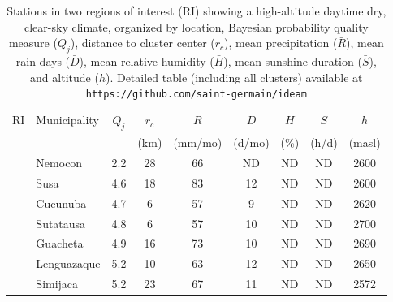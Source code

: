 \documentclass[12pt]{iopart}
\begin{document}
\begin{table}
\caption{\label{tabfin}Stations in two regions of interest (RI) showing a high-altitude daytime dry, clear-sky climate, organized by location, Bayesian probability quality measure ($Q_j$), distance to cluster center ($r_c$), mean precipitation  ($\bar{R}$), mean rain days ($\bar{D}$), mean relative humidity  ($\bar{H}$), mean sunshine duration  ($\bar{S}$), and altitude ($h$). Detailed table (including all clusters) available at \texttt{https://github.com/saint-germain/ideam} \\}

\begin{tabular}{c|lcc|cccc|c}
\toprule
RI&                   Municipality  &  $Q_j$ &  $r_c$  &   $\bar{R}$ &   $\bar{D}$  &   $\bar{H}$  &  $\bar{S}$ &  $h$ \\
 &                   &    &    (km) &   (mm/mo) &  (d/mo) &   (\%) &   (h/d) &  (masl) \\
\midrule
            &                       Nemocon &            2.2 &                        28 &                        66 &                   ND &                        ND &                          ND &    2600 \\
            &                          Susa &            4.6 &                        18 &                        83 &                   12 &                        ND &                          ND &    2600 \\
            &                      Cucunuba &            4.7 &                         6 &                        57 &                    9 &                        ND &                          ND &    2620 \\
            &                     Sutatausa &            4.8 &                         6 &                        57 &                   10 &                        ND &                          ND &    2700 \\
            &                      Guacheta &            4.9 &                        16 &                        73 &                   10 &                        ND &                          ND &    2690 \\
            &                   Lenguazaque &            5.2 &                        10 &                        63 &                   12 &                        ND &                          ND &    2650 \\
            &                      Simijaca &            5.2 &                        23 &                        67 &                   11 &                        ND &                          ND &    2572 \\

\end{tabular}
\end{table}
\end{document}
